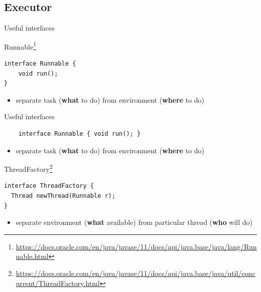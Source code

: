 \subsection{Executor}

\begin{frame}[t,fragile]{Useful interfaces}

Runnable\footnote{\tiny\url{https://docs.oracle.com/en/java/javase/11/docs/api/java.base/java/lang/Runnable.html}}
\begin{verbatim}
interface Runnable {
    void run();
}
\end{verbatim}

\begin{itemize}
    \item separate task (\textbf{what} to do) from environment (\textbf{where} to do)
\end{itemize}
\end{frame}


\begin{frame}{Useful interfaces}

\begin{verbatim}
    interface Runnable { void run(); }
\end{verbatim}
\begin{itemize}
    \item separate task (\textbf{what} to do) from environment (\textbf{where} to do)
\end{itemize}

\pause

ThreadFactory\footnote<2->{\tiny\url{https://docs.oracle.com/en/java/javase/11/docs/api/java.base/java/util/concurrent/ThreadFactory.html}}

\begin{verbatim}
interface ThreadFactory {
  Thread newThread(Runnable r);
}
\end{verbatim}

\begin{itemize}
    \item separate environment (\textbf{what} available) from particular thread (\textbf{who} will do)
\end{itemize}
\end{frame}



